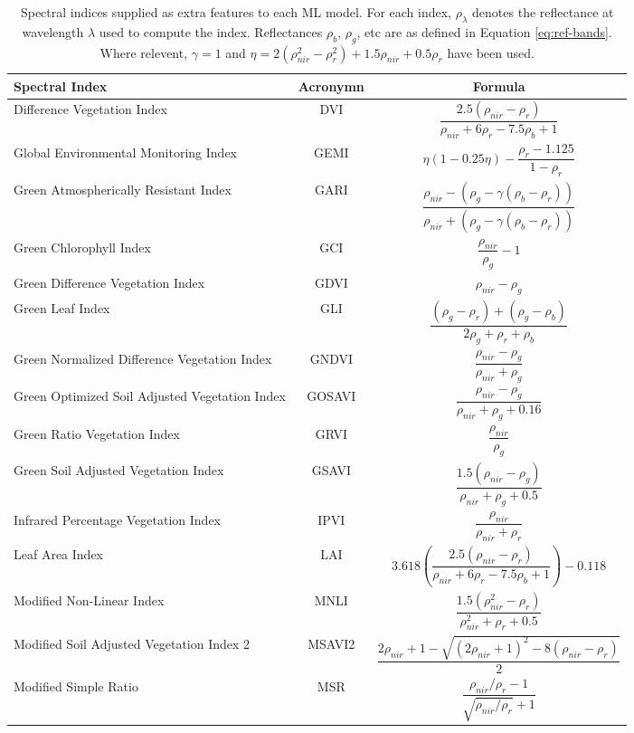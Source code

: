 \begin{sidewaystable}[p]
  \caption{Spectral indices supplied as extra features to each ML model. For each index, $\rho_{\lambda}$ denotes the reflectance at wavelength $\lambda$ used to compute the index. Reflectances $\rho_b$, $\rho_g$, etc are as defined in Equation \ref{eq:ref-bands}. Where relevent, $\gamma = 1$ and $\eta = 2(\rho_{nir}^2 - \rho_r^2) + 1.5\rho_{nir} + 0.5\rho_r$ have been used.}
  \label{table:spectral-indices}
  \begin{center}
  \begin{tabular}{lcc}\hline
  \textbf{Spectral Index} & \textbf{Acronymn} & \textbf{Formula} \\ \hline
  Difference Vegetation Index & DVI & $\dfrac{2.5(\rho_{nir} - \rho_r)}{\rho_{nir} + 6\rho_r - 7.5\rho_b + 1}$ \\
  Global Environmental Monitoring Index & GEMI & $\eta(1 - 0.25\eta) - \dfrac{\rho_r - 1.125}{1 - \rho_r}$ \\
  Green Atmospherically Resistant Index & GARI & $\dfrac{\rho_{nir} - (\rho_g - \gamma(\rho_b - \rho_r))}{\rho_{nir} + (\rho_g - \gamma (\rho_b - \rho_r))}$ \\
  Green Chlorophyll Index & GCI & $\dfrac{\rho_{nir}}{\rho_g} - 1$ \\
  Green Difference Vegetation Index & GDVI & $\rho_{nir} - \rho_g$ \\
  Green Leaf Index & GLI & $\dfrac{(\rho_g - \rho_r) + (\rho_g - \rho_b)}{2 \rho_g + \rho_r + \rho_b}$ \\
  Green Normalized Difference Vegetation Index & GNDVI & $\dfrac{\rho_{nir} - \rho_g}{\rho_{nir} + \rho_g}$ \\
  Green Optimized Soil Adjusted Vegetation Index & GOSAVI & $\dfrac{\rho_{nir} - \rho_g}{\rho_{nir} + \rho_g + 0.16}$ \\
  Green Ratio Vegetation Index & GRVI & $\dfrac{\rho_{nir}}{\rho_g}$ \\
  Green Soil Adjusted Vegetation Index & GSAVI & $\dfrac{1.5(\rho_{nir} - \rho_g)}{\rho_{nir} + \rho_g + 0.5}$ \\
  Infrared Percentage Vegetation Index & IPVI & $\dfrac{\rho_{nir}}{\rho_{nir} + \rho_r}$ \\
  Leaf Area Index & LAI & $3.618 \left(\dfrac{2.5 (\rho_{nir} - \rho_r)}{\rho_{nir} + 6\rho_r - 7.5 \rho_b + 1}\right) - 0.118$ \\
  Modified Non-Linear Index & MNLI & $\dfrac{1.5(\rho_{nir}^2 - \rho_r)}{\rho_{nir}^2 + \rho_r + 0.5}$ \\
  Modified Soil Adjusted Vegetation Index 2 & MSAVI2 & $\dfrac{2\rho_{nir} + 1 - \sqrt{(2\rho_{nir} + 1)^2 - 8(\rho_{nir} - \rho_r)}}{2}$ \\
  Modified Simple Ratio & MSR & $\dfrac{\rho_{nir}/\rho_r - 1}{\sqrt{\rho_{nir} / \rho_r} + 1}$ 
  \end{tabular}
  \end{center}
\end{sidewaystable}


